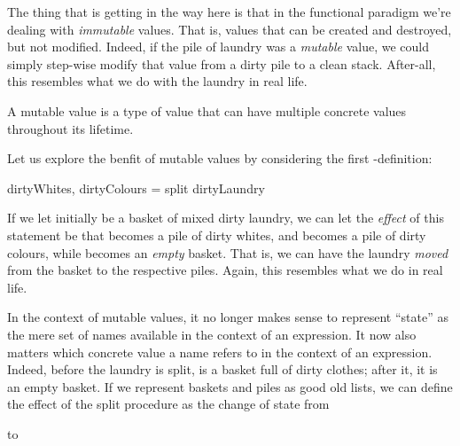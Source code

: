 The thing that is getting in the way here is that in the functional paradigm
we're dealing with \emph{immutable} values. That is, values that can be created
and destroyed, but not modified. Indeed, if the pile of laundry was a
\emph{mutable} value, we could simply step-wise modify that value from a dirty
pile to a clean stack. After-all, this resembles what we do with the laundry in
real life.

\begin{definition}

A mutable value is a type of value that can have multiple concrete values
throughout its lifetime.

\end{definition}

Let us explore the benfit of mutable values by considering the first
-definition:

\begin{code}
dirtyWhites, dirtyColours = split dirtyLaundry
\end{code}

If we let  initially be a basket of mixed dirty laundry, we
can let the \emph{effect} of this statement be that  becomes a
pile of dirty whites, and  becomes a pile of dirty colours,
while  becomes an \emph{empty} basket. That is, we can have
the laundry \emph{moved} from the basket to the respective piles. Again, this
resembles what we do in real life.

In the context of mutable values, it no longer makes sense to represent
``state'' as the mere set of names available in the context of an expression.
It now also matters which concrete value a name refers to in the context of an
expression. Indeed, before the laundry is split,  is a basket
full of dirty clothes; after it, it is an empty basket. If we represent baskets
and piles as good old lists, we can define the effect of the split procedure as
the change of state from

\begin{codebox}
\end{codebox}

to

\begin{codebox}
\end{codebox}

